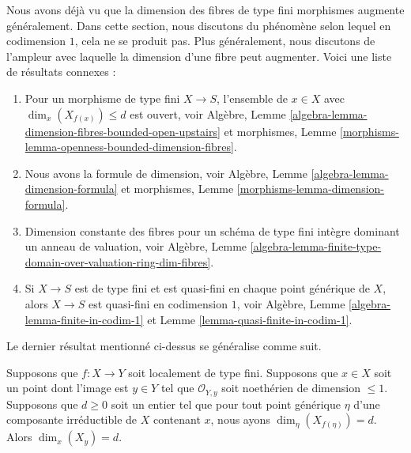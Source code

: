 \noindent
Nous avons déjà vu que la dimension des fibres de type fini morphismes augmente
généralement. Dans cette section, nous discutons du phénomène selon lequel en
codimension $1$, cela ne se produit pas. Plus généralement, nous discutons de l'ampleur
avec laquelle la dimension d'une fibre peut augmenter. Voici une liste de résultats connexes :
\begin{enumerate}
\item Pour un morphisme de type fini $X \to S$, l'ensemble
de $x \in X$ avec $\dim_x(X_{f(x)}) \leq d$ est ouvert,
voir Algèbre, Lemme
\ref{algebra-lemma-dimension-fibres-bounded-open-upstairs} et
morphismes, Lemme
\ref{morphisms-lemma-openness-bounded-dimension-fibres}. \item
Nous avons la formule de dimension, voir Algèbre, Lemme
\ref{algebra-lemma-dimension-formula} et morphismes, Lemme
\ref{morphisms-lemma-dimension-formula}. \item Dimension constante
des fibres pour un schéma de type fini intègre dominant un anneau de
valuation, voir Algèbre, Lemme
\ref{algebra-lemma-finite-type-domain-over-valuation-ring-dim-fibres}. \item
Si $X \to S$ est de type fini et est quasi-fini en chaque point générique de
$X$, alors $X \to S$ est quasi-fini en codimension $1$, voir Algèbre, Lemme
\ref{algebra-lemma-finite-in-codim-1} et Lemme \ref{lemma-quasi-finite-in-codim-1}.
\end{enumerate}
Le dernier résultat mentionné ci-dessus se généralise comme suit.

\begin{lemma}
\label{lemma-dimension-fibre-in-codim-1}
Supposons que $f : X \to Y$ soit localement de type fini. Supposons que $x \in
X$ soit un point dont l'image est $y \in Y$ tel que $\mathcal{O}_{Y, y}$ soit
noethérien de dimension $\leq 1$. Supposons que $d \geq 0$ soit un entier tel
que pour tout point générique $\eta$ d'une composante irréductible de $X$
contenant $x$, nous ayons $\dim_\eta(X_{f(\eta)}) = d$. Alors $\dim_x(X_y) = d$.
\end{lemma}

